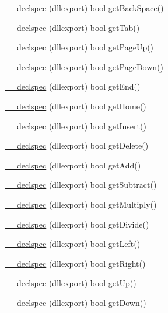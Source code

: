 \begin{DoxyCompactItemize}
\item 
\hyperlink{class_keyboard_aa5ceda17f17b14beea415c77c8025a8f}{\-\_\-\-\_\-declspec} (dllexport) bool get\-Back\-Space()
\item 
\hyperlink{class_keyboard_a4af8be83b35b94a924047ae08c07d5cf}{\-\_\-\-\_\-declspec} (dllexport) bool get\-Tab()
\item 
\hyperlink{class_keyboard_a6bb4828fc7eb51f34496ee35de124f36}{\-\_\-\-\_\-declspec} (dllexport) bool get\-Page\-Up()
\item 
\hyperlink{class_keyboard_aa09da86855217dfd1e674c6d05c96357}{\-\_\-\-\_\-declspec} (dllexport) bool get\-Page\-Down()
\item 
\hyperlink{class_keyboard_a06a5769cb2ca72a9ce54b386827af8f0}{\-\_\-\-\_\-declspec} (dllexport) bool get\-End()
\item 
\hyperlink{class_keyboard_abbd4e958f0ca6529e5f0b685dba6aa3f}{\-\_\-\-\_\-declspec} (dllexport) bool get\-Home()
\item 
\hyperlink{class_keyboard_afc045fed61c7dd501cc6f4978bee8eb2}{\-\_\-\-\_\-declspec} (dllexport) bool get\-Insert()
\item 
\hyperlink{class_keyboard_a40ddcaa5743445d143bc85a10d0d1523}{\-\_\-\-\_\-declspec} (dllexport) bool get\-Delete()
\item 
\hyperlink{class_keyboard_ae21d0dd42b08b8e2955a1a1cd34670f5}{\-\_\-\-\_\-declspec} (dllexport) bool get\-Add()
\item 
\hyperlink{class_keyboard_a97bd4b7611daa5e1ef0ae705e426ddaf}{\-\_\-\-\_\-declspec} (dllexport) bool get\-Subtract()
\item 
\hyperlink{class_keyboard_a298050fa66eea03d57d972c326268024}{\-\_\-\-\_\-declspec} (dllexport) bool get\-Multiply()
\item 
\hyperlink{class_keyboard_a66bdc9acdba2727e4a39970c2022c6d3}{\-\_\-\-\_\-declspec} (dllexport) bool get\-Divide()
\item 
\hyperlink{class_keyboard_a727d260573fa3ea4cb893cc9bb1340ef}{\-\_\-\-\_\-declspec} (dllexport) bool get\-Left()
\item 
\hyperlink{class_keyboard_acc877a9eea180db2967ce1d2ae44bae5}{\-\_\-\-\_\-declspec} (dllexport) bool get\-Right()
\item 
\hyperlink{class_keyboard_a8f904bb4cef91d019603c671e853d960}{\-\_\-\-\_\-declspec} (dllexport) bool get\-Up()
\item 
\hyperlink{class_keyboard_a3cdd5134f3f3b1638fadc8d2a2784f0f}{\-\_\-\-\_\-declspec} (dllexport) bool get\-Down()
\item 

\end{DoxyCompactItemize}
